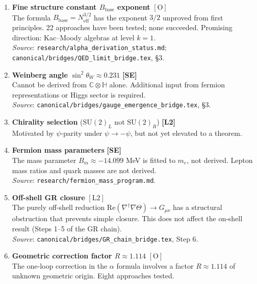 \documentclass[12pt,a4paper]{article}
\newcommand{\Ltwo}{\textbf{[L2]}}
\newcommand{\SE}{\textbf{[SE]}}
\begin{document}
\begin{enumerate}

\item \textbf{Fine structure constant $B_\text{base}$ exponent} \hfill $[\mathrm{O}]$\\
The formula $B_\text{base} = N_\text{eff}^{3/2}$ has the exponent $3/2$
unproved from first principles.  22 approaches have been tested; none succeeded.
Promising direction: Kac--Moody algebras at level $k = 1$.\\
\textit{Source}: \texttt{research/alpha\_derivation\_status.md};
\texttt{canonical/bridges/QED\_limit\_bridge.tex}, \S3.

\item \textbf{Weinberg angle} $\sin^2\theta_W \approx 0.231$ \hfill \SE{}\\
Cannot be derived from $\mathbb{C}\otimes\mathbb{H}$ alone.
Additional input from fermion representations or Higgs sector is required.\\
\textit{Source}: \texttt{canonical/bridges/gauge\_emergence\_bridge.tex}, \S3.

\item \textbf{Chirality selection} ($\mathrm{SU}(2)_L$ not $\mathrm{SU}(2)_R$)
      \hfill \Ltwo{}\\
Motivated by $\psi$-parity under $\psi\to-\psi$, but not yet elevated
to a theorem.

\item \textbf{Fermion mass parameters} \hfill \SE{}\\
The mass parameter $B_m \approx -14.099$ MeV is fitted to $m_e$, not derived.
Lepton mass ratios and quark masses are not derived.\\
\textit{Source}: \texttt{research/fermion\_mass\_program.md}.

\item \textbf{Off-shell GR closure} \hfill $[\mathrm{L2}]$\\
The purely off-shell reduction
$\mathrm{Re}(\nabla^\dagger\nabla\Theta) \to G_{\mu\nu}$
has a structural obstruction that prevents simple closure.
This does not affect the on-shell result (Steps 1--5 of the GR chain).\\
\textit{Source}: \texttt{canonical/bridges/GR\_chain\_bridge.tex}, Step 6.

\item \textbf{Geometric correction factor $R \approx 1.114$} \hfill $[\mathrm{O}]$\\
The one-loop correction in the $\alpha$ formula involves a factor
$R \approx 1.114$ of unknown geometric origin.  Eight approaches tested.


\end{enumerate}
\end{document}
